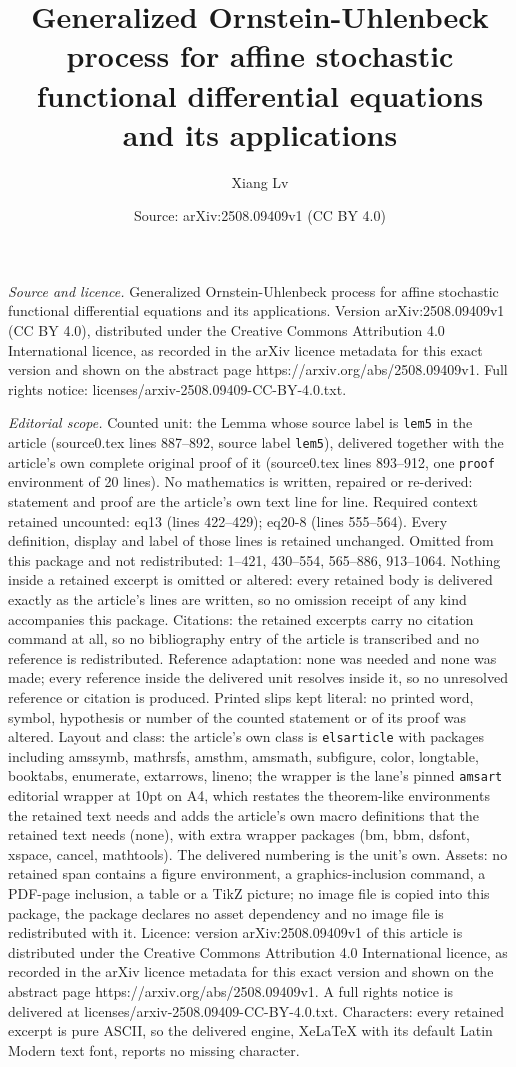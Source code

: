 \documentclass[10pt,a4paper]{amsart}
\title[Generalized Ornstein-Uhlenbeck process for affine stochastic]{Generalized Ornstein-Uhlenbeck process for affine stochastic functional differential equations and its applications}
\author{Xiang Lv}
\date{Source: arXiv:2508.09409v1 (CC BY 4.0)}
\begin{document}
\maketitle

\noindent\emph{Source and licence.} Generalized Ornstein-Uhlenbeck process for affine stochastic functional differential equations and its applications. Version arXiv:2508.09409v1 (CC BY 4.0), distributed under the Creative Commons Attribution 4.0 International licence, as recorded in the arXiv licence metadata for this exact version and shown on the abstract page https://arxiv.org/abs/2508.09409v1. Full rights notice: licenses/arxiv-2508.09409-CC-BY-4.0.txt.\par\smallskip

\noindent\textit{Editorial scope.} Counted unit: the Lemma whose source label is \texttt{lem5} in the article (source0.tex lines 887--892, source label \texttt{lem5}), delivered together with the article's own complete original proof of it (source0.tex lines 893--912, one \texttt{proof} environment of 20 lines). No mathematics is written, repaired or re-derived: statement and proof are the article's own text line for line. Required context retained uncounted: eq13 (lines 422--429); eq20-8 (lines 555--564). Every definition, display and label of those lines is retained unchanged. Omitted from this package and not redistributed: 1--421, 430--554, 565--886, 913--1064. Nothing inside a retained excerpt is omitted or altered: every retained body is delivered exactly as the article's lines are written, so no omission receipt of any kind accompanies this package. Citations: the retained excerpts carry no citation command at all, so no bibliography entry of the article is transcribed and no reference is redistributed. Reference adaptation: none was needed and none was made; every reference inside the delivered unit resolves inside it, so no unresolved reference or citation is produced. Printed slips kept literal: no printed word, symbol, hypothesis or number of the counted statement or of its proof was altered. Layout and class: the article's own class is \texttt{elsarticle} with packages including amssymb, mathrsfs, amsthm, amsmath, subfigure, color, longtable, booktabs, enumerate, extarrows, lineno; the wrapper is the lane's pinned \texttt{amsart} editorial wrapper at 10pt on A4, which restates the theorem-like environments the retained text needs and adds the article's own macro definitions that the retained text needs (none), with extra wrapper packages (bm, bbm, dsfont, xspace, cancel, mathtools). The delivered numbering is the unit's own. Assets: no retained span contains a figure environment, a graphics-inclusion command, a PDF-page inclusion, a table or a TikZ picture; no image file is copied into this package, the package declares no asset dependency and no image file is redistributed with it. Licence: version arXiv:2508.09409v1 of this article is distributed under the Creative Commons Attribution 4.0 International licence, as recorded in the arXiv licence metadata for this exact version and shown on the abstract page https://arxiv.org/abs/2508.09409v1. A full rights notice is delivered at licenses/arxiv-2508.09409-CC-BY-4.0.txt. Characters: every retained excerpt is pure ASCII, so the delivered engine, XeLaTeX with its default Latin Modern text font, reports no missing character.
\end{document}
